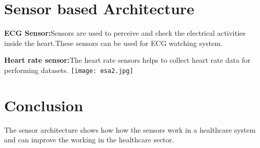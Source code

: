 \documentclass[nobib]{MSword}
\begin{document}
\section{Sensor based Architecture}
\textbf{ECG Sensor:}Sensors are used to perceive and check the electrical activities inside the heart.These sensors can be used for ECG watching system. 
\newline
\newline

\textbf{Heart rate sensor:}The heart rate sensors helps to collect heart rate data for performing datasets.
\newline
\newline
\texttt{[image: esa2.jpg]}
\section{Conclusion}
The sensor architecture shows how how the sensors work in a healthcare system and can improve the working in the healthcare sector.
\end{document}
